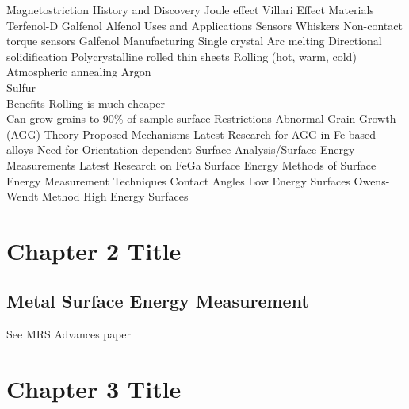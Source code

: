 \documentclass[12pt,letterpaper]{report}
\begin{document}
\begin{outline}[enumerate]
\1 Magnetostriction
	\2 History and Discovery
		\3 Joule effect
		\3 Villari Effect
	\2 Materials
		\3 Terfenol-D
		\3 Galfenol
		\3 Alfenol
	\2 Uses and Applications
		\3 Sensors
			\4 Whiskers
			\4 Non-contact torque sensors
\1 Galfenol
	\2 Manufacturing 
		\3 Single crystal 
			\4 Arc melting
			\4 Directional solidification
		\3 Polycrystalline rolled thin sheets
			\4 Rolling (hot, warm, cold)
			\4 Atmospheric annealing 
				 Argon\\
				 Sulfur\\
			\4 Benefits
				 Rolling is much cheaper\\
				 Can grow grains to 90\% of sample surface
			\4 Restrictions
\1 Abnormal Grain Growth (AGG)
	\2 Theory
	\2 Proposed Mechanisms
	\2 Latest Research for AGG in Fe-based alloys
	\2 Need for Orientation-dependent Surface Analysis/Surface Energy Measurements
		\3 Latest Research on FeGa Surface Energy 
\1 Methods of Surface Energy Measurement Techniques
	\2 Contact Angles
		\3 Low Energy Surfaces
			\4 Owens-Wendt Method
		\3 High Energy Surfaces
		\3 
\end{outline}



\newpage
\chapter{Chapter 2 Title}
\section{Metal Surface Energy Measurement}\label{section2}

\begin{outline}[enumerate]
\1 See MRS Advances paper
	
\end{outline}




\chapter{Chapter 3 Title}
\end{document}
